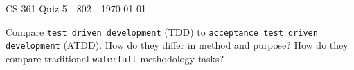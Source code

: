 \documentclass{exam}
\begin{document}
\begin{center}
	CS 361 Quiz 5 - 802 - \today
\end{center}

\vspace{1em}

\begin{center}
\end{center}

\begin{questions}
	
\question[10] Compare \texttt{test driven development} (TDD) to \texttt{acceptance test driven development} (ATDD). How do they differ in method and purpose? How do they compare traditional \texttt{waterfall} methodology tasks?

\end{questions}
\end{document}
